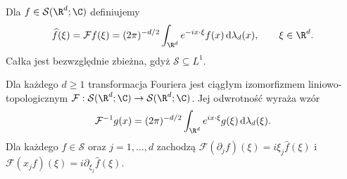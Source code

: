 \begin{definicja}
\label{def:fourier-schwartz17}
Dla $f\in\mathcal S(\R^d;\C)$ definiujemy
\[
\widehat f(\xi)=\mathcal Ff(\xi)=
(2\pi)^{-d/2}\int_{\R^d}e^{-ix\cdot\xi}f(x)\,
\mathrm d\lambda_d(x),\qquad\xi\in\R^d.
\]
Całka jest bezwzględnie zbieżna, gdyż $\mathcal S\subseteq L^1$.
\end{definicja}

\begin{twierdzenie}
\label{thm:fourier-schwartz17}
Dla każdego $d\ge1$ transformacja Fouriera jest ciągłym
izomorfizmem liniowo-topologicznym
$\mathcal F:\mathcal S(\R^d;\C)\to\mathcal S(\R^d;\C)$.
Jej odwrotność wyraża wzór
\[
\mathcal F^{-1}g(x)=(2\pi)^{-d/2}
\int_{\R^d}e^{ix\cdot\xi}g(\xi)\,
\mathrm d\lambda_d(\xi).
\]
Dla każdego $f\in\mathcal S$ oraz $j=1,\dots,d$ zachodzą
$\mathcal F(\partial_jf)(\xi)=i\xi_j\widehat f(\xi)$
i $\mathcal F(x_jf)(\xi)=i\partial_{\xi_j}\widehat f(\xi)$.
\end{twierdzenie}
